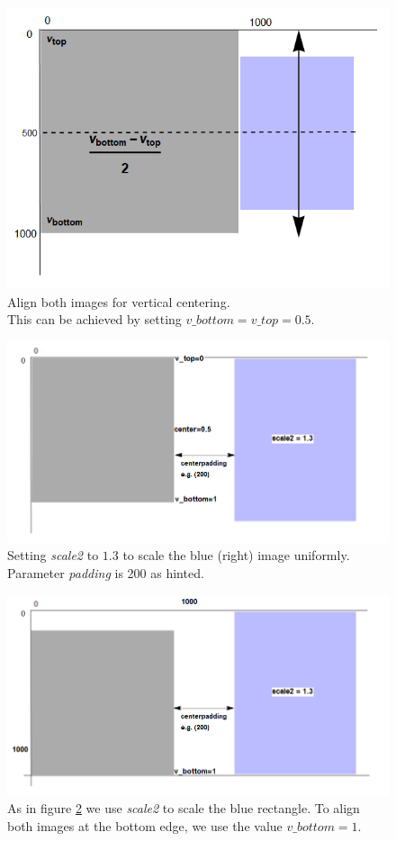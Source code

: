 \documentclass[a4paper, 12pt, bibliography=totoc]{scrartcl}
\begin{document}
\begin{figure}[H]
	\centering
	\includegraphics[width=0.8\linewidth]{images/svgjoinpad0centered.png}
	\caption{Align both images for vertical centering. \\
		This can be achieved by setting $v\_bottom=v\_top=0.5$.}
	\label{fig:svgjoinpad0centered}
\end{figure}

\begin{figure}[H]
	\centering
	\includegraphics[width=0.8\linewidth]{images/svgjoinscaled.png}
	\caption{Setting \textit{scale2} to $1.3$ to scale the blue (right) image uniformly. Parameter \textit{padding} is 200 as hinted.}
	\label{fig:svgjoinscaled}
\end{figure}

\begin{figure}[H]
	\centering
	\includegraphics[width=0.8\linewidth]{images/svgjoinscaledbottom.png}
	\caption{As in figure \ref{fig:svgjoinscaled} we use \textit{scale2} to scale the blue rectangle. To align both images at the bottom edge, we use the value $v\_bottom=1$.}
	\label{fig:svgjoinscaledbottom}
\end{figure}
\end{document}
